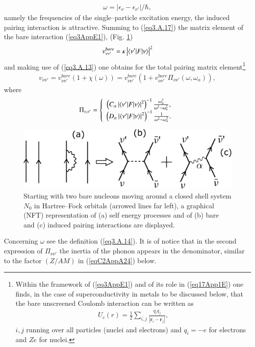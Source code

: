 \begin{subappendices}
\begin{align}
\omega=|\epsilon_\nu-\epsilon_{\nu'}|/\hbar,
\end{align}
namely the frequencies of the single--particle excitation energy, the induced pairing interaction is attractive.
Summing to (\ref{eq3.A.17}) the matrix element of the bare interaction (\ref{eq3AppE1}), (Fig. \ref{fig3_A_3})
\begin{align}
v_{\nu\nu'}^{bare}=\kappa\left|\langle {\nu'|F|\nu} \rangle\right|^2
\end{align}
and making use of (\ref{eq3.A.13}) one obtains for the total pairing matrix element\footnote{Within the framework of (\ref{eq3AppE1}) and of its role in (\ref{eq17App1E}) one finds, in the case of superconductivity in metals to be discussed below,  that the bare unscreened Coulomb interaction can be written as 
	\begin{align*}
	U_c(r)=\frac{1}{2}\sum_{i,j}\frac{q_iq_j}{|\mathbf r_i-\mathbf r_j|}, 
	\end{align*}
	$i,j$ running over all particles (nuclei and electrons) and $q_i=-e$ for electrons and $Ze$ for nuclei.}
\begin{align}\label{eq17App1E}
v_{\nu\nu'}=v_{\nu\nu'}^{bare}\left(1+\chi(\omega)\right)=v_{\nu\nu'}^{bare}\left(1+v_{\nu\nu'}^{bare}\Pi_{\nu\nu'}(\omega,\omega_\alpha)\right),
\end{align}
where
\begin{align}
\Pi_{\nu,\nu'}=\left\{\begin{array}{c}
 \left(C_\alpha\left|\langle {\nu'|F|\nu} \rangle\right|^2\right)^{-1}\frac{\omega_\alpha^2}{\omega^2-\omega_\alpha^2},\\ 
\left(D_\alpha\left|\langle {\nu'|F|\nu} \rangle\right|^2\right)^{-1}\frac{1}{\omega^2-\omega_\alpha^2}.
\end{array}
\right. 
\end{align}
   \begin{figure}
   \centerline{\includegraphics*[width=12cm,angle=0	]{nutshell/figs/fig3_A_3}}
   \caption{Starting with two bare nucleons moving around a closed shell system $N_0$ in Hartree--Fock orbitals (arrowed lines far left), a graphical (NFT) representation of (a) self energy processes and of (b) bare and (c) induced pairing interactions are displayed.}\label{fig3_A_3}
   \end{figure}
Concerning $\omega$ see the definition (\ref{eq3.A.14}). It is of notice that in the second expression of $\Pi_{\nu\nu'}$  the inertia of the phonon appears in the denominator, similar to the factor $(Z/AM)$  in (\ref{eqC2AppA24}) below.



\end{subappendices}
